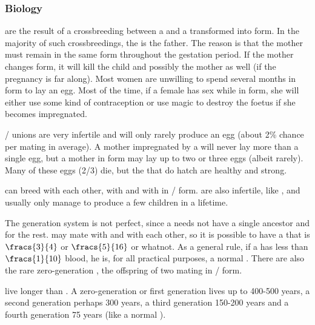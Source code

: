 \subsubsection{Biology}
\Rachyth{} are the result of a crossbreeding between a \scatha{} and a \dragon{} transformed into \scatha{} form. In the majority of such crossbreedings, the \dragon{} is the father. The reason is that the mother must remain in the same form throughout the gestation period. If the mother changes form, it will kill the child and possibly the mother as well (if the pregnancy is far along). Most \dragon{} women are unwilling to spend several months in \scatha{} form to lay an egg. Most of the time, if a female \dragon{} has sex while in \scatha{} form, she will either use some kind of contraception or use magic to destroy the foetus if she becomes impregnated. 

\Dragon{}/\scatha{} unions are very infertile and will only rarely produce an egg (about 2\% chance per mating in average). A \scathaese{} mother impregnated by a \dragon{} will never lay more than a single egg, but a \draconic{} mother in \scatha{} form may lay up to two or three eggs (albeit rarely). Many of these eggs (2/3) die, but the \rachyth{} that do hatch are healthy and strong. 

\Rachyth{} can breed with each other, with \scathae{} and with \dragons{} in \scatha{}/\rachyth{} form. \Rachyth{} are also infertile, like \dragons{}, and usually only manage to produce a few children in a lifetime. 

The generation system is not perfect, since a \rachyth{} needs not have a single \draconic{} ancestor and \scatha{} for the rest. \Rachyth{} may mate with \dragons{} and with each other, so it is possible to have a \rachyth{} that is $\fracs{3}{4}$ \dragon{} or $\fracs{5}{16}$ \dragon{} or whatnot. As a general rule, if a \rachyth{} has less than $\fracs{1}{10}$ \dragon{} blood, he is, for all practical purposes, a normal \scatha{}. There are also the rare zero-generation \rachyth{}, the offspring of two \dragons{} mating in \scatha{}/\rachyth{} form. 

\Rachyth{} live longer than \scathae{}. A zero-generation or first generation \rachyth{} lives up to 400-500 years, a second generation perhaps 300 years, a third generation 150-200 years and a fourth generation 75 years (like a normal \scatha{}). 


